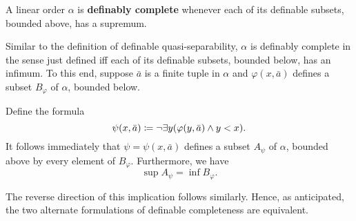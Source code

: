 \begin{dfn}
	A linear order $\alpha$ is \textbf{definably complete} whenever each of its
	definable subsets, bounded above, has a supremum.
\end{dfn}

Similar to the definition of definable quasi-separability, $\alpha$ is definably
complete in the sense just defined iff each of its definable subsets, bounded
below, has an infimum.  To this end, suppose $\bar{a}$ is a finite tuple in
$\alpha$ and $\varphi(x,\bar{a})$ defines a subset $B_{\varphi}$ of $\alpha$,
bounded below.

Define the formula
\begin{equation}
	\psi(x,\bar{a})\coloneqq\neg\exists y(\varphi(y,\bar{a})\wedge y<x).
\end{equation}
It follows immediately that $\psi=\psi(x,\bar{a})$ defines a subset $A_{\psi}$
of $\alpha$, bounded above by every element of $B_{\varphi}$.  Furthermore, we
have
\begin{equation}
	\sup A_{\psi}=\inf B_{\varphi}.
\end{equation}

The reverse direction of this implication follows similarly.  Hence, as
anticipated, the two alternate formulations of definable completeness are
equivalent.

